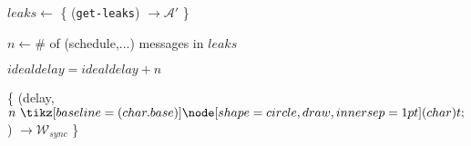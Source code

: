 \begin{bbox}[title={Algorithm $\msf{SimGetLeaks}$}]

$leaks \leftarrow$ \{ \Send (\texttt{get-leaks}) $\rightarrow \mathcal{\mathcal{A}'}$ \}

$n \leftarrow \#$ of (schedule,...) messages in $leaks$

$idealdelay = idealdelay + n$

\{ \Send (delay, $n \token$) $\rightarrow \mathcal{W}_{sync}$ \}

\end{bbox}


